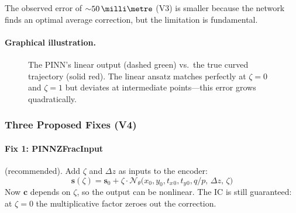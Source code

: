 \documentclass[11pt,a4paper]{article}
\newcommand{\SI}[2]{#1\,\text{#2}}
\newcommand{\zfrac}{\zeta}
\newcommand{\dz}{\Delta z}
\newcommand{\qop}{q/p}
\newcommand{\vstate}{\mathbf{s}}
\newcommand{\vc}{\mathbf{c}}
\newcommand{\tx}{t_x}
\newcommand{\ty}{t_y}
\begin{document}
The observed error of ${\sim}\SI{50}{\milli\metre}$ (V3) is smaller because
the network finds an optimal average correction, but the limitation is
fundamental.

\paragraph{Graphical illustration.}
\begin{figure}[H]
\centering
{}
\caption{The PINN's linear output (dashed green) vs.\ the true curved
  trajectory (solid red).  The linear ansatz matches perfectly at $\zfrac=0$
  and $\zfrac=1$ but deviates at intermediate points---this error grows
  quadratically.}
\label{fig:linear_vs_curved}
\end{figure}

\subsubsection{Three Proposed Fixes (V4)}

\paragraph{Fix 1: PINNZFracInput} (recommended).
Add $\zfrac$ and $\dz$ as inputs to the encoder:
\begin{equation}\label{eq:pinnzfrac}
  \vstate(\zfrac) = \vstate_0 + \zfrac \cdot
  \mathcal{N}_\theta\!\bigl(x_0, y_0, \tx{}_0, \ty{}_0, \qop,\, \dz,\,
  \zfrac\bigr)
\end{equation}
Now $\vc$ depends on $\zfrac$, so the output can be nonlinear.  The
IC is still guaranteed: at $\zfrac=0$ the multiplicative factor
zeroes out the correction.
\end{document}
